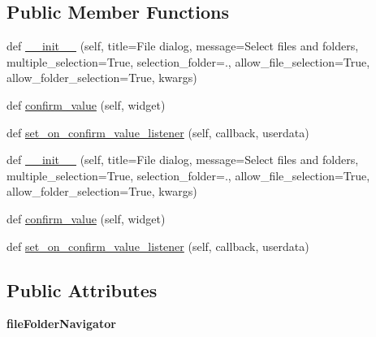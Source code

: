 \subsection*{Public Member Functions}
\begin{DoxyCompactItemize}
\item 
def \hyperlink{classremi_1_1gui_1_1FileSelectionDialog_a0587b1cc5d2e2b1d300d98cb94206a50}{\+\_\+\+\_\+init\+\_\+\+\_\+} (self, title=\textquotesingle{}File dialog\textquotesingle{}, message=\textquotesingle{}Select files and folders\textquotesingle{}, multiple\+\_\+selection=True, selection\+\_\+folder=\textquotesingle{}.\textquotesingle{}, allow\+\_\+file\+\_\+selection=True, allow\+\_\+folder\+\_\+selection=True, kwargs)
\item 
def \hyperlink{classremi_1_1gui_1_1FileSelectionDialog_a23dd582a965317b649046e5e6a765a1a}{confirm\+\_\+value} (self, widget)
\item 
def \hyperlink{classremi_1_1gui_1_1FileSelectionDialog_a8e0b7dfeb324cc7c3174394543b6cf8b}{set\+\_\+on\+\_\+confirm\+\_\+value\+\_\+listener} (self, callback, userdata)
\item 
def \hyperlink{classremi_1_1gui_1_1FileSelectionDialog_a0587b1cc5d2e2b1d300d98cb94206a50}{\+\_\+\+\_\+init\+\_\+\+\_\+} (self, title=\textquotesingle{}File dialog\textquotesingle{}, message=\textquotesingle{}Select files and folders\textquotesingle{}, multiple\+\_\+selection=True, selection\+\_\+folder=\textquotesingle{}.\textquotesingle{}, allow\+\_\+file\+\_\+selection=True, allow\+\_\+folder\+\_\+selection=True, kwargs)
\item 
def \hyperlink{classremi_1_1gui_1_1FileSelectionDialog_a23dd582a965317b649046e5e6a765a1a}{confirm\+\_\+value} (self, widget)
\item 
def \hyperlink{classremi_1_1gui_1_1FileSelectionDialog_a8e0b7dfeb324cc7c3174394543b6cf8b}{set\+\_\+on\+\_\+confirm\+\_\+value\+\_\+listener} (self, callback, userdata)
\end{DoxyCompactItemize}
\subsection*{Public Attributes}
\begin{DoxyCompactItemize}
\item 
{\bfseries file\+Folder\+Navigator}\hypertarget{classremi_1_1gui_1_1FileSelectionDialog_aca750c81b8e0460e983400502ec57a1b}{}\label{classremi_1_1gui_1_1FileSelectionDialog_aca750c81b8e0460e983400502ec57a1b}

\end{DoxyCompactItemize}
